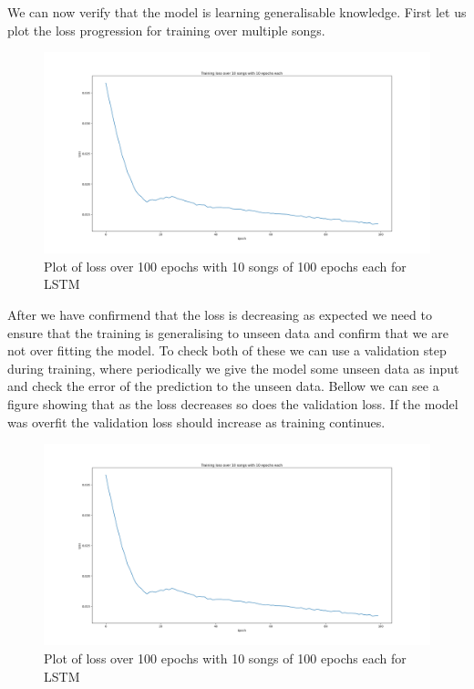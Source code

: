 \documentclass{article}
\begin{document}
We can now verify that the model is learning generalisable knowledge. First let us plot the loss progression for training over multiple songs.
\begin{figure}[H]
\caption{Plot of loss over 100 epochs with 10 songs of 100 epochs each for LSTM}
\includegraphics[scale=0.35]{loss_plot_10songs.png}
\end{figure}
After we have confirmend that the loss is decreasing as expected we need to ensure that the training is generalising to unseen data and confirm that we are not over fitting the model. To check both of these we can use a validation step during training, where periodically we give the model some unseen data as input and check the error of the prediction to the unseen data. Bellow we can see a figure showing that as the loss decreases so does the validation loss. If the model was overfit the validation loss should increase as training continues.
\begin{figure}[H]
\caption{Plot of loss over 100 epochs with 10 songs of 100 epochs each for LSTM}
\includegraphics[scale=0.35]{loss_plot_10songs.png}
\end{figure}
\end{document}
